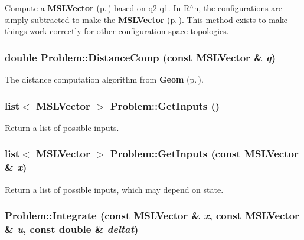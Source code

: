 Compute a {\bf MSLVector} {\rm (p.\,\pageref{class_MSLVector})} based on q2-q1. In R$^\wedge$n, the configurations are simply subtracted to make the {\bf MSLVector} {\rm (p.\,\pageref{class_MSLVector})}. This method exists to make things work correctly for other configuration-space topologies.

\subsubsection{\setlength{\rightskip}{0pt plus 5cm}double Problem::Distance\-Comp (const {\bf MSLVector} \& {\em q})\hspace{0.3cm}{\tt  [virtual]}}\label{class_Problem_a13}


The distance computation algorithm from {\bf Geom} {\rm (p.\,\pageref{class_Geom})}.

\subsubsection{\setlength{\rightskip}{0pt plus 5cm}list$<$ {\bf MSLVector} $>$ Problem::Get\-Inputs ()\hspace{0.3cm}{\tt  [virtual]}}\label{class_Problem_a5}


Return a list of possible inputs.

\subsubsection{\setlength{\rightskip}{0pt plus 5cm}list$<$ {\bf MSLVector} $>$ Problem::Get\-Inputs (const {\bf MSLVector} \& {\em x})\hspace{0.3cm}{\tt  [virtual]}}\label{class_Problem_a4}


Return a list of possible inputs, which may depend on state.

\subsubsection{ Problem::Integrate (const {\bf MSLVector} \& {\em x}, const {\bf MSLVector} \& {\em u}, const double \& {\em deltat})\hspace{0.3cm}{\tt  [virtual]}}\label{class_Problem_a6}


